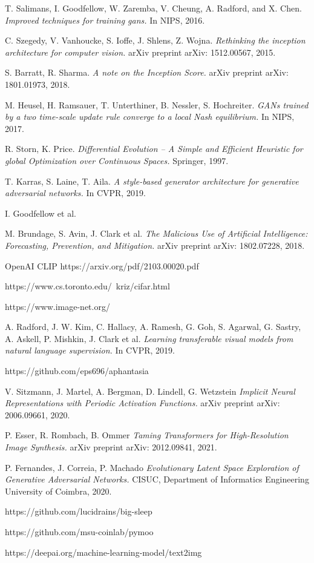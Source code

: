 \documentclass[12pt,a4paper,openany]{book}
\begin{document}
\begin{thebibliography}{a,b,c}
 T. Salimans, I. Goodfellow, W. Zaremba, V. Cheung, A. Radford, and X. Chen. {\it Improved techniques for training gans.} In NIPS, 2016.

 C. Szegedy, V. Vanhoucke, S. Ioffe, J. Shlens, Z. Wojna. {\it Rethinking the inception architecture for computer vision.} arXiv preprint arXiv: 1512.00567, 2015.

 S. Barratt, R. Sharma. {\it A note on the Inception Score.} arXiv preprint arXiv: 1801.01973, 2018.

 M. Heusel, H. Ramsauer, T. Unterthiner, B. Nessler, S. Hochreiter. {\it GANs trained by a two time-scale update rule converge to a local Nash equilibrium.} In NIPS, 2017.

 R. Storn, K. Price. {\it Differential Evolution – A Simple and Efficient Heuristic for global Optimization over Continuous Spaces.} Springer, 1997.

 T. Karras, S. Laine, T. Aila. {\it A style-based generator architecture for generative adversarial networks.} In CVPR, 2019.

 I. Goodfellow et al. 

 M. Brundage, S. Avin, J. Clark et al. {\it The Malicious Use of Artificial Intelligence: Forecasting, Prevention, and Mitigation.} arXiv preprint arXiv: 1802.07228, 2018.

 OpenAI CLIP https://arxiv.org/pdf/2103.00020.pdf

 https://www.cs.toronto.edu/~kriz/cifar.html

 https://www.image-net.org/

 A. Radford, J. W. Kim, C. Hallacy, A. Ramesh, G. Goh, S. Agarwal, G. Sastry, A. Askell, P. Mishkin, J. Clark et al. {\it Learning transferable visual models
from natural language supervision.} In CVPR, 2019.

 https://github.com/eps696/aphantasia

 V. Sitzmann, J. Martel, A. Bergman, D. Lindell, G. Wetzstein {\it Implicit Neural Representations with Periodic Activation Functions.} arXiv preprint arXiv: 2006.09661, 2020.

 P. Esser, R. Rombach, B. Ommer {\it Taming Transformers for High-Resolution Image Synthesis.} arXiv preprint arXiv: 2012.09841, 2021.

 P. Fernandes, J. Correia, P. Machado {\it Evolutionary Latent Space Exploration of Generative Adversarial Networks.} CISUC, Department of Informatics Engineering University of Coimbra, 2020.

 https://github.com/lucidrains/big-sleep

 https://github.com/msu-coinlab/pymoo

 https://deepai.org/machine-learning-model/text2img

\end{thebibliography}
\end{document}
